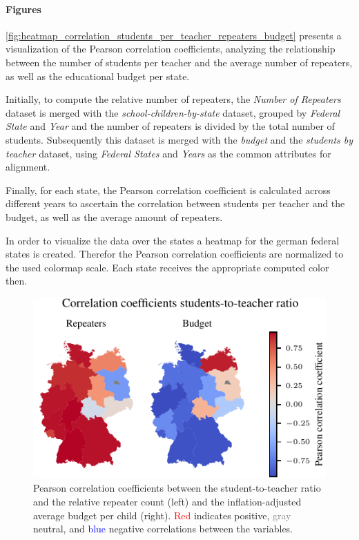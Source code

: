 \paragraph{Figures}
\autoref{fig:heatmap_correlation_students_per_teacher_repeaters_budget} presents a visualization of the Pearson correlation coefficients, analyzing the relationship between the number of students per teacher and the average number of repeaters, as well as the educational budget per state. 

Initially, to compute the relative number of repeaters, the \textit{Number of Repeaters} dataset is merged with the \textit{school-children-by-state} dataset, grouped by \textit{Federal State} and \textit{Year} and the number of repeaters is divided by the total number of students. Subsequently this dataset is merged with the \textit{budget} and the \textit{students by teacher} dataset, using \textit{Federal States} and \textit{Years} as the common attributes for alignment. 

Finally, for each state, the Pearson correlation coefficient is calculated across different years to ascertain the correlation between students per teacher and the budget, as well as the average amount of repeaters.

In order to visualize the data over the states a heatmap for the german federal states is created. Therefor the Pearson correlation coefficients are normalized to the used colormap scale. Each state receives the appropriate computed color then.

\begin{figure}[h]
    \centering
    \includegraphics{fig/fig_heatmap_correlation_students_per_teacher_repeaters_budget.pdf}
    \caption{Pearson correlation coefficients between the student-to-teacher ratio and the relative repeater count (left) and the inflation-adjusted average budget per child (right). \textcolor{red}{Red} indicates positive, \textcolor{gray}{gray} neutral, and \textcolor{blue}{blue} negative correlations between the variables.}
    \label{fig:heatmap_correlation_students_per_teacher_repeaters_budget}
\end{figure}
